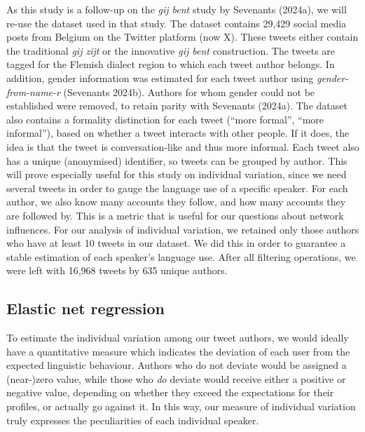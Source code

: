 \documentclass[
  letterpaper,
  DIV=11,
  numbers=noendperiod,
  oneside]{scrartcl}
\begin{document}
As this study is a follow-up on the \emph{gij bent} study by Sevenants
(2024a), we will re-use the dataset used in that study. The dataset
contains 29,429 social media posts from Belgium on the Twitter platform
(now X). These tweets either contain the traditional \emph{gij zijt} or
the innovative \emph{gij bent} construction. The tweets are tagged for
the Flemish dialect region to which each tweet author belongs. In
addition, gender information was estimated for each tweet author using
\emph{gender-from-name-r} (Sevenants 2024b). Authors for whom gender
could not be established were removed, to retain parity with Sevenants
(2024a). The dataset also contains a formality distinction for each
tweet (``more formal'', ``more informal''), based on whether a tweet
interacts with other people. If it does, the idea is that the tweet is
conversation-like and thus more informal. Each tweet also has a unique
(anonymised) identifier, so tweets can be grouped by author. This will
prove especially useful for this study on individual variation, since we
need several tweets in order to gauge the language use of a specific
speaker. For each author, we also know many accounts they follow, and
how many accounts they are followed by. This is a metric that is useful
for our questions about network influences. For our analysis of
individual variation, we retained only those authors who have at least
10 tweets in our dataset. We did this in order to guarantee a stable
estimation of each speaker's language use. After all filtering
operations, we were left with 16,968 tweets by 635 unique authors.

\subsection{Elastic net regression}\label{elastic-net-regression}

To estimate the individual variation among our tweet authors, we would
ideally have a quantitative measure which indicates the deviation of
each user from the expected linguistic behaviour. Authors who do not
deviate would be assigned a (near-)zero value, while those who \emph{do}
deviate would receive either a positive or negative value, depending on
whether they exceed the expectations for their profiles, or actually go
against it. In this way, our measure of individual variation truly
expresses the peculiarities of each individual speaker.
\end{document}
